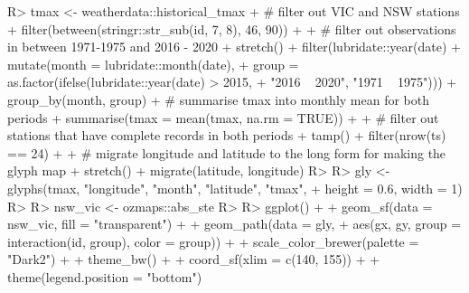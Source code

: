 \documentclass[
]{jss}
\begin{document}
\begin{CodeChunk}
\begin{CodeInput}
R> tmax <- weatherdata::historical_tmax %
+   # filter out VIC and NSW stations
+   filter(between(stringr::str_sub(id, 7, 8), 46, 90)) %
+   
+   # filter out observations in between 1971-1975 and 2016 - 2020
+   stretch() %
+   filter(lubridate::year(date) %
+   mutate(month = lubridate::month(date), 
+          group = as.factor(ifelse(lubridate::year(date) > 2015, 
+                                   "2016 ~ 2020", "1971 ~ 1975"))) %
+   group_by(month, group) %
+   # summarise tmax into monthly mean for both periods
+   summarise(tmax = mean(tmax, na.rm = TRUE)) %
+   
+   # filter out stations that have complete records in both periods 
+   tamp() %
+   filter(nrow(ts) == 24) %
+   
+   # migrate longitude and latitude to the long form for making the glyph map
+   stretch() %
+   migrate(latitude, longitude)
R> 
R> gly <- glyphs(tmax, "longitude", "month", "latitude", "tmax",
+               height = 0.6, width = 1)
R> 
R> nsw_vic <- ozmaps::abs_ste %
R> 
R> ggplot() + 
+   geom_sf(data = nsw_vic, fill = "transparent") + 
+   geom_path(data = gly, 
+             aes(gx, gy, group = interaction(id, group), color = group)) +
+   scale_color_brewer(palette = "Dark2") + 
+   theme_bw() + 
+   coord_sf(xlim = c(140, 155)) + 
+   theme(legend.position = "bottom")
\end{CodeInput}
\end{CodeChunk}
\end{document}
